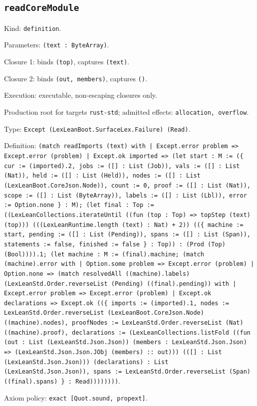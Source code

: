 \documentclass[11pt]{article}
\begin{document}
\subsection*{\texttt{readCoreModule}}
\noindent Kind: \texttt{definition}.\par
\noindent Parameters: \texttt{(text : ByteArray)}.\par
\noindent Closure 1: binds \texttt{(top)}, captures \texttt{(text)}.\par
\noindent Closure 2: binds \texttt{(out, members)}, captures \texttt{()}.\par
\noindent Execution: executable, non-escaping closures only.\par
\noindent Production root for targets \texttt{rust-std}; admitted effects: \texttt{allocation, overflow}.\par
\noindent Type: \texttt{Except (LexLeanBoot.SurfaceLex.Failure) (Read)}.\par
\noindent Definition: \texttt{(match readImports (text) with | Except.error problem => Except.error (problem) | Except.ok imported => (let start : M := (\{ cur := (imported).2, jobs := ([] : List (Job)), vals := ([] : List (Nat)), held := ([] : List (Held)), nodes := ([] : List (LexLeanBoot.CoreJson.Node)), count := 0, proof := ([] : List (Nat)), scope := ([] : List (ByteArray)), labels := ([] : List (Lbl)), error := Option.none \} : M); (let final : Top := ((LexLeanCollections.iterateUntil ((fun (top : Top) => topStep (text) (top))) (((LexLeanRuntime.length (text) : Nat) + 2)) ((\{ machine := start, pending := ([] : List (Pending)), spans := ([] : List (Span)), statements := false, finished := false \} : Top)) : (Prod (Top) (Bool)))).1; (let machine : M := (final).machine; (match (machine).error with | Option.some problem => Except.error (problem) | Option.none => (match resolvedAll ((machine).labels) (LexLeanStd.Order.reverseList (Pending) ((final).pending)) with | Except.error problem => Except.error (problem) | Except.ok declarations => Except.ok ((\{ imports := (imported).1, nodes := LexLeanStd.Order.reverseList (LexLeanBoot.CoreJson.Node) ((machine).nodes), proofNodes := LexLeanStd.Order.reverseList (Nat) ((machine).proof), declarations := (LexLeanCollections.listFold ((fun (out : List (LexLeanStd.Json.Json)) (members : LexLeanStd.Json.Json) => (LexLeanStd.Json.Json.JObj (members) :: out))) (([] : List (LexLeanStd.Json.Json))) (declarations) : List (LexLeanStd.Json.Json)), spans := LexLeanStd.Order.reverseList (Span) ((final).spans) \} : Read))))))))}.\par
\noindent Axiom policy: \texttt{exact [Quot.sound, propext]}.\par
\end{document}
